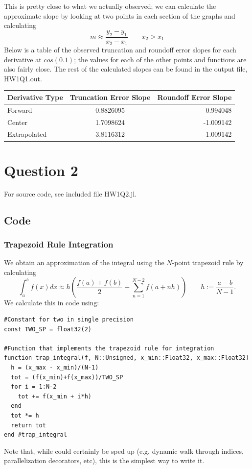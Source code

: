 \documentclass{article}
\begin{document}
This is pretty close to what we actually observed; we can calculate the approximate slope by looking at two points in each section of the graphs and calculating
$$m \approx \frac{y_2 - y_1}{x_2 - x_1} \qquad x_2 > x_1$$
Below is a table of the observed truncation and roundoff error slopes for each derivative at $cos(0.1)$; the values for each of the other points and functions are also fairly close. The rest of the calculated slopes can be found in the output file, HW1Q1.out.

\begin{tabular}{l | c | r}
Derivative Type & Truncation Error Slope & Roundoff Error Slope \\
\hline
Forward & 0.8826095 & -0.994048 \\
Center & 1.7098624 & -1.009142 \\
Extrapolated & 3.8116312 & -1.009142 \\
\end{tabular}



\section{Question 2}
For source code, see included file HW1Q2.jl.
\subsection{Code}
\subsubsection{Trapezoid Rule Integration}
We obtain an approximation of the integral using the $N$-point trapezoid rule by calculating
$$\int_a^bf(x)dx \approx h(\frac{f(a) + f(b)}{2} + \sum\limits_{n=1}^{N-2}f(a+nh)) \qquad h := \frac{a-b}{N-1}.$$
We calculate this in code using:
\begin{lstlisting}
#Constant for two in single precision
const TWO_SP = float32(2)

#Function that implements the trapezoid rule for integration
function trap_integral(f, N::Unsigned, x_min::Float32, x_max::Float32)
  h = (x_max - x_min)/(N-1)
  tot = (f(x_min)+f(x_max))/TWO_SP
  for i = 1:N-2
    tot += f(x_min + i*h)
  end
  tot *= h
  return tot
end #trap_integral
\end{lstlisting}
Note that, while could certainly be sped up (e.g. dynamic walk through indices, parallelization decorators, etc), this is the simplest way to write it.
\end{document}
